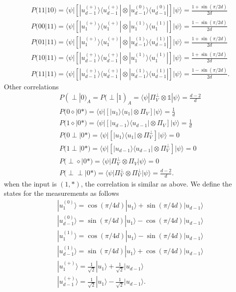 \documentclass[11pt,letterpaper]{article}
\newcommand{\ket}[1]{|#1\rangle}
\newcommand{\bra}[1]{\langle#1|}
\newcommand{\ketbra}[2]{|#1\rangle\langle#2|}
\newcommand{\1}{\mathbb{1}}
\theoremstyle{definition}
\begin{document}
\begin{align}
	&P(11|10) = \bra{\psi}  \left[\ketbra{u_{d-1}^{(+)}}{u_{d-1}^{(+)}}\otimes \ketbra{u_{d-1}^{(0)}}{u_{d-1}^{(0)}}\right]\ket{\psi} = \frac{1+\sin(\pi/2d)}{2d}\\
	&P(00|11) = \bra{\psi}  \left[\ketbra{u_1^{(+)}}{u_1^{(+)}}\otimes \ketbra{u_1^{(1)}}{u_1^{(1)}}\right]\ket{\psi} = \frac{1-\sin(\pi/2d)}{2d}\\
	&P(01|11) = \bra{\psi}  \left[\ketbra{u_1^{(+)}}{u_1^{(+)}}\otimes \ketbra{u_{d-1}^{(1)}}{u_{d-1}^{(1)}}\right]\ket{\psi} = \frac{1+\sin(\pi/2d)}{2d}\\
	&P(10|11) = \bra{\psi}  \left[\ketbra{u_{d-1}^{(+)}}{u_{d-1}^{(+)}}\otimes \ketbra{u_1^{(1)}}{u_1^{(1)}}\right]\ket{\psi} = \frac{1+\sin(\pi/2d)}{2d}\\
	&P(11|11) = \bra{\psi}  \left[\ketbra{u_{d-1}^{(+)}}{u_{d-1}^{(+)}}\otimes \ketbra{u_{d-1}^{(1)}}{u_{d-1}^{(1)}}\right]\ket{\psi} = \frac{1-\sin(\pi/2d)}{2d}.
\end{align}
Other correlations
\begin{align}
	&P(\perp|0)_A = P(\perp|1)_A = \bra{\psi} \Pi_V^\perp \otimes \1\ket{\psi} = \frac{d-2}{d}\\
	&P(0\diamond|0\ast) = \bra{\psi}\left[\ketbra{u_1}{u_1}\otimes\Pi_V\right]\ket{\psi} = \frac{1}{d}\\
	&P(1\diamond|0\ast)= \bra{\psi}\left[\ketbra{u_{d-1}}{u_{d-1}}\otimes\Pi_V\right]\ket{\psi} = \frac{1}{d}\\
	&P(0\perp|0\ast) = \bra{\psi}\left[\ketbra{u_{1}}{u_{1}}\otimes\Pi_V^\perp\right]\ket{\psi} = 0\\
	&P(1\perp|0\ast)= \bra{\psi}\left[\ketbra{u_{d-1}}{u_{d-1}}\otimes\Pi_V^\perp\right]\ket{\psi} = 0\\
	&P(\perp \diamond | 0 \ast) = \bra{\psi} \Pi_V^\perp \otimes \Pi_V \ket{\psi} = 0\\
	&P(\perp \perp | 0 \ast) =  \bra{\psi} \Pi_V^\perp \otimes \Pi_V^\perp \ket{\psi} = \frac{d-2}{d}.
\end{align}
when the input is $(1, \ast)$, the correlation is similar as above.
We define the states for the measurements as follows
\begin{align}
	&\ket{u_1^{(0)}} = \cos(\pi/4d)\ket{u_1} + \sin(\pi/4d)\ket{u_{d-1}}\\
	&\ket{u_{d-1}^{(0)}} = \sin(\pi/4d)\ket{u_1} - \cos(\pi/4d)\ket{u_{d-1}}\\
	&\ket{u_1^{(1)}} = \cos(\pi/4d)\ket{u_1} - \sin(\pi/4d)\ket{u_{d-1}}\\
	&\ket{u_{d-1}^{(1)}} = \sin(\pi/4d)\ket{u_1} + \cos(\pi/4d)\ket{u_{d-1}}\\
	&\ket{u_1^{(+)}} = \frac{1}{\sqrt{2}}\ket{u_1} + \frac{1}{\sqrt{2}}\ket{u_{d-1}}\\
	&\ket{u_{d-1}^{(+)}} = \frac{1}{\sqrt{2}}\ket{u_1} - \frac{1}{\sqrt{2}}\ket{u_{d-1}}.
\end{align}
\end{document}
